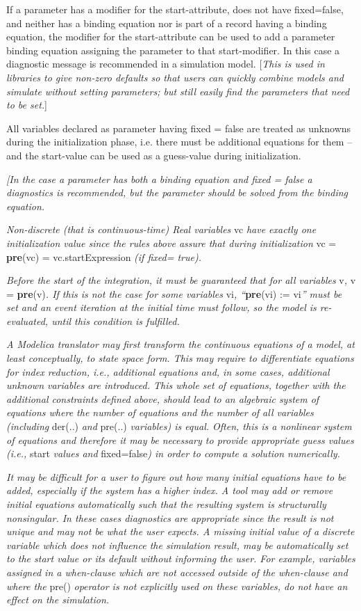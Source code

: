If a parameter has a modifier for the start-attribute, does not have
fixed=false, and neither has a binding equation nor is part of a record
having a binding equation, the modifier for the start-attribute can be
used to add a parameter binding equation assigning the parameter to that
start-modifier. In this case a diagnostic message is recommended in a
simulation model. {[}\emph{This is used in libraries to give non-zero
defaults so that users can quickly combine models and simulate without
setting parameters; but still easily find the parameters that need to be
set.}{]}

All variables declared as parameter having fixed = false are treated as
unknowns during the initialization phase, i.e. there must be additional
equations for them -- and the start-value can be used as a guess-value
during initialization.

\emph{{[}In the case a parameter has both a binding equation and fixed =
false a diagnostics is recommended, but the parameter should be solved
from the binding equation.}

\emph{Non-discrete (that is continuous-time) Real variables} vc
\emph{have exactly one initialization value since the rules above assure
that during initialization} vc = \textbf{pre}(vc) = vc.startExpression
\emph{(if fixed= true).}

\emph{Before the start of the integration, it must be guaranteed that
for all variables} v\emph{,} v = \textbf{pre}(v)\emph{. If this is not
the case for some variables} vi\emph{, ``}\textbf{pre}(vi) := vi\emph{''
must be set and an event iteration at the initial time must follow, so
the model is re-evaluated, until this condition is fulfilled.}

\emph{A Modelica translator may first transform the continuous equations
of a model, at least conceptually, to state space form. This may require
to differentiate equations for index reduction, i.e., additional
equations and, in some cases, additional unknown variables are
introduced. This whole set of equations, together with the additional
constraints defined above, should lead to an algebraic system of
equations where the number of equations and the number of all variables
(including} der(..) \emph{and} pre(..) \emph{variables) is equal. Often,
this is a nonlinear system of equations and therefore it may be
necessary to provide appropriate guess values (i.e.,} start \emph{values
and} fixed=false\emph{) in order to compute a solution numerically.}

\emph{It may be difficult for a user to figure out how many initial
equations have to be added, especially if the system has a higher index.
A tool may add or remove initial equations automatically such that the
resulting system is structurally nonsingular. In these cases diagnostics
are appropriate since the result is not unique and may not be what the
user expects. A missing initial value of a discrete variable which does
not influence the simulation result, may be automatically set to the
start value or its default without informing the user. For example,
variables assigned in a when-clause which are not accessed outside of
the when-clause and where the} pre() \emph{operator is not explicitly
used on these variables, do not have an effect on the simulation.}

